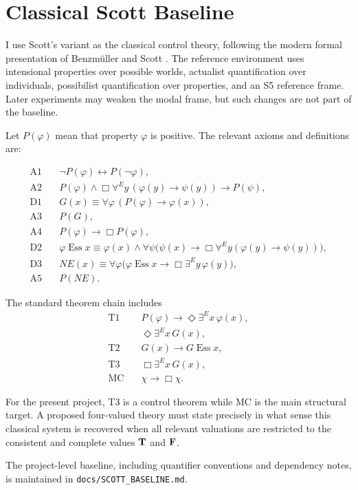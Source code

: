 \section{Classical Scott Baseline}
\label{sec:scott}

\statusestablished

I use Scott's variant as the classical control theory, following the modern formal presentation of Benzm\"uller and Scott \cite{BenzmuellerScott2025}. The reference environment uses intensional properties over possible worlds, actualist quantification over individuals, possibilist quantification over properties, and an S5 reference frame. Later experiments may weaken the modal frame, but such changes are not part of the baseline.

Let \(P(\varphi)\) mean that property \(\varphi\) is positive. The relevant axioms and definitions are:

\begin{align}
\mathrm{A1}\quad & \neg P(\varphi) \leftrightarrow P(\neg\varphi),\\
\mathrm{A2}\quad & P(\varphi)\land \Box\forall^E y\,(\varphi(y)\rightarrow\psi(y))\rightarrow P(\psi),\\
\mathrm{D1}\quad & G(x) \equiv \forall\varphi\,(P(\varphi)\rightarrow\varphi(x)),\\
\mathrm{A3}\quad & P(G),\\
\mathrm{A4}\quad & P(\varphi)\rightarrow\Box P(\varphi),\\
\mathrm{D2}\quad & \varphi\operatorname{Ess}x \equiv \varphi(x)\land
  \forall\psi\bigl(\psi(x)\rightarrow\Box\forall^E y(\varphi(y)\rightarrow\psi(y))\bigr),\\
\mathrm{D3}\quad & NE(x) \equiv \forall\varphi\bigl(\varphi\operatorname{Ess}x\rightarrow
  \Box\exists^E y\,\varphi(y)\bigr),\\
\mathrm{A5}\quad & P(NE).
\end{align}

The standard theorem chain includes
\begin{align}
\mathrm{T1}\quad & P(\varphi)\rightarrow\Diamond\exists^E x\,\varphi(x),\\
& \Diamond\exists^E x\,G(x),\\
\mathrm{T2}\quad & G(x)\rightarrow G\operatorname{Ess}x,\\
\mathrm{T3}\quad & \Box\exists^E x\,G(x),\\
\mathrm{MC}\quad & \chi\rightarrow\Box\chi.
\end{align}

For the present project, T3 is a control theorem while MC is the main structural target. A proposed four-valued theory must state precisely in what sense this classical system is recovered when all relevant valuations are restricted to the consistent and complete values \(\mathbf{T}\) and \(\mathbf{F}\).

The project-level baseline, including quantifier conventions and dependency notes, is maintained in \texttt{docs/SCOTT\_BASELINE.md}.

